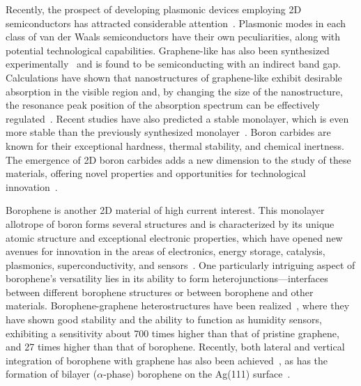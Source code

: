 Recently, the prospect of developing plasmonic devices employing 2D semiconductors has attracted considerable attention~\cite{agarwal2018plasmonics, qiu2018optical}.
Plasmonic modes in each class of van der Waals semiconductors have their own peculiarities, along with potential technological capabilities.
Graphene-like  has also been synthesized experimentally~\cite{yanagisawa2004phonon, yanagisawa2006phonon, tanaka2005novel} and is found to be semiconducting with an indirect band gap.
Calculations have shown that nanostructures of graphene-like  exhibit desirable absorption in the visible region and, by changing the size of the nanostructure,
the resonance peak position of the absorption spectrum can be effectively regulated~\cite{chen2019plasmon}.
Recent studies have also predicted a stable  monolayer,
which is even more stable than the previously synthesized  monolayer~\cite{tian2019}.
Boron carbides are known for their exceptional hardness,
thermal stability, and chemical inertness.
The emergence of 2D boron carbides adds a new dimension to the study of these materials,
offering novel properties and opportunities for technological innovation~\cite{luo2011predicting,fan2018two}.

Borophene is another 2D material of high current interest.
This monolayer allotrope of boron forms several structures and is characterized by its unique atomic structure and exceptional electronic properties,
which have opened new avenues for innovation in the areas of electronics,
energy storage, catalysis, plasmonics, superconductivity, and sensors~\cite{qiu2018optical}.
One particularly intriguing aspect of borophene's versatility lies in its ability to form heterojunctions---interfaces between different borophene structures or between borophene and other materials.
Borophene-graphene heterostructures have been realized~\cite{hou2021borophene},
where they have shown good stability and the ability to function as humidity sensors,
exhibiting a sensitivity about 700 times higher than that of pristine graphene,
and 27 times higher than that of borophene.
Recently, both lateral and vertical integration of borophene with graphene has also been achieved~\cite{liu2019borophene},
as has the formation of bilayer ($\alpha$-phase) borophene on the Ag(111) surface~\cite{liu2022}.

